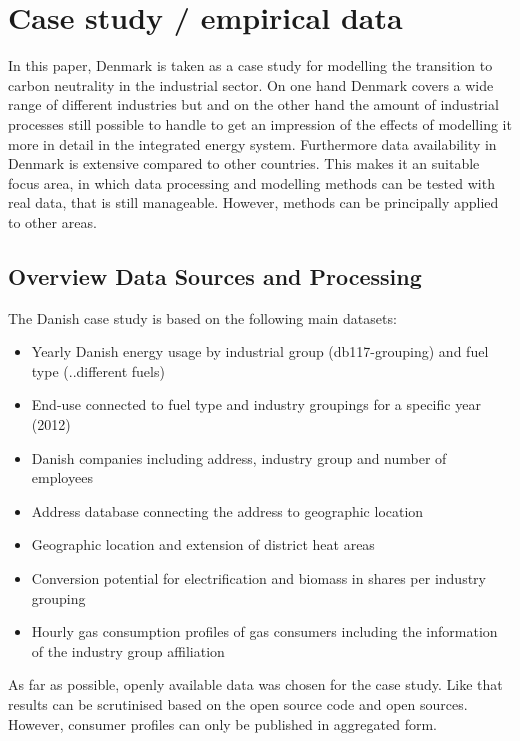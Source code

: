 \documentclass[review]{elsarticle}
\begin{document}

\section{Case study / empirical data} \label{datadescr}


In this paper, Denmark is taken as a case study for modelling the transition to carbon neutrality in the industrial sector. On one hand Denmark covers a wide range of different industries but  and on the other hand the amount of industrial processes still possible to handle to get an impression of the effects of modelling it more in detail in the integrated energy system. Furthermore data availability in Denmark is extensive compared to other countries. This makes it an suitable focus area, in which data processing and modelling methods can be tested with real data, that is still manageable. However, methods can be principally applied to other areas.

\subsection{Overview Data Sources and Processing}
The Danish case study is based on the following main datasets:
\begin{itemize}
 \item Yearly Danish energy usage by industrial group (db117-grouping) and fuel type (..different fuels)
 \item End-use connected to fuel type and industry groupings for a specific year (2012) 
 \item Danish companies including address, industry group and number of employees
 \item Address database connecting the address to geographic location
 \item Geographic location and extension of district heat areas
 \item Conversion potential for electrification and biomass in shares per industry grouping
 \item Hourly gas consumption profiles of gas consumers including the information of the industry group affiliation
\end{itemize}

As far as possible, openly available data was chosen for the case study. Like that results can be scrutinised based on the open source code and open sources. However, consumer profiles can only be published in aggregated form.
\end{document}
